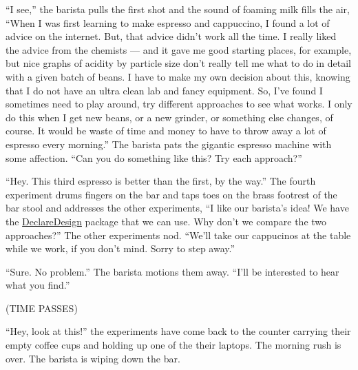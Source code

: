 \documentclass[
]{article}
\begin{document}
``I see,'' the barista pulls the first shot and the sound of foaming milk fills
the air, ``When I was first learning to make espresso and cappuccino, I found a
lot of advice on the internet. But, that advice didn't work all the time. I
really liked the advice from the chemists --- and it gave me good starting
places, for example, but nice graphs of acidity by particle size don't really
tell me what to do in detail with a given batch of beans. I
have to make my own decision about this, knowing that I do not have an ultra
clean lab and fancy equipment. So, I've found I sometimes need to play around,
try different approaches to see what works. I only do this when I get new
beans, or a new grinder, or something else changes, of course. It would be
waste of time and money to have to throw away a lot of espresso every morning.''
The barista pats the gigantic espresso machine with some affection. ``Can you do
something like this? Try each approach?''

``Hey. This third espresso is better than the first, by the way.'' The fourth
experiment drums fingers on the bar and taps toes on the brass footrest of the
bar stool and addresses the other experiments, ``I like our barista's idea! We have the
\href{https://declaredesign.org/}{DeclareDesign} package that we can use. Why don't
we compare the two approaches?'' The other experiments nod. ``We'll take our
cappucinos at the table while we work, if you don't mind. Sorry to step away.''

``Sure. No problem.'' The barista motions them away. ``I'll be interested to hear what you find.''

(TIME PASSES)

``Hey, look at this!'' the experiments have come back to the counter carrying
their empty coffee cups and holding up one of the their laptops. The morning
rush is over. The barista is wiping down the bar.
\end{document}
